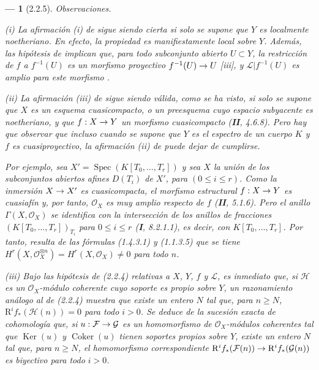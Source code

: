 \documentclass[10pt,oneside,openany]{book}
\theoremstyle{egaenv}\newtheorem*{env}{---}
\theoremstyle{egastatement}
\theoremstyle{egadescription}
\renewcommand{\leq}{\leqslant}
\renewcommand{\geq}{\geqslant}
\renewcommand{\to}{\mathchoice{\longrightarrow}{\rightarrow}{\rightarrow}{\rightarrow}}
\begin{document}
\begin{env}[2.2.5]
\label{III.2.2.5}
\label{III.2.2.5-fr}
\emph{Observaciones.}

(i) La afirmación (i) de  sigue siendo cierta si solo se supone que $Y$ es \emph{localmente noetheriano}.
En efecto, la propiedad es manifiestamente local sobre $Y$.
Además, las hipótesis de  implican que, para todo subconjunto abierto $U\subset Y$, la restricción de $f$ a $f^{-1}(U)$ es un morfismo proyectivo
$f^{-1}(U)\to U$
[iii], y $\mathcal L|f^{-1}(U)$ es amplio para este morfismo .

(ii) La afirmación (iii) de  sigue siendo válida, como se ha visto, si solo se supone que $X$ es un esquema cuasicompacto, o un preesquema cuyo espacio subyacente es noetheriano, y que $f:X\to Y$ un morfismo cuasicompacto (\textbf{II}, 4.6.8). Pero hay que observar que incluso cuando se supone que $Y$ es el \emph{espectro de un cuerpo} $K$ y $f$ es \emph{cuasiproyectivo}, la afirmación (ii) de  puede dejar de cumplirse.

Por ejemplo, sea
$X'=\operatorname{Spec}(K[T_0,\ldots,T_r])$
y sea $X$ la unión de los subconjuntos abiertos afines $D(T_i)$ de $X'$, para $(0\leq i\leq r)$.
Como la inmersión $X\to X'$ es cuasicompacta, el morfismo estructural $f:X\to Y$ es cuasiafín  y, por tanto, $\mathcal O_X$ es muy amplio respecto de $f$ (\textbf{II}, 5.1.6). Pero el anillo
$\Gamma(X,\mathcal O_X)$ se identifica con la intersección de los anillos de
fracciones $(K[T_0,\ldots,T_r])_{T_i}$ para $0\leq i\leq r$
(\textbf{I}, 8.2.1.1), es decir, con $K[T_0,\ldots,T_r]$. Por tanto, resulta
de las fórmulas (1.4.3.1) y (1.1.3.5) que se tiene
$H^r(X,\mathcal O_X^{\otimes n})=H^r(X,\mathcal O_X)\neq0$
para todo $n$.

(iii) Bajo las hipótesis de (2.2.4) relativas a $X$, $Y$, $f$ y $\mathcal L$, es inmediato que, si $\mathcal H$ es un $\mathcal O_X$-módulo coherente cuyo soporte es \emph{propio sobre $Y$}, un razonamiento análogo al de (2.2.4) muestra que existe un entero $N$ tal que, para $n\geq N$,
$\mathrm R^if_*(\mathcal H(n))=0$
para todo $i>0$. Se deduce de la sucesión exacta de cohomología que, si $u:\mathcal F\to\mathcal G$ es un homomorfismo de $\mathcal O_X$-módulos coherentes tal que $\operatorname{Ker}(u)$ y $\operatorname{Coker}(u)$ tienen soportes \emph{propios sobre $Y$}, existe un entero $N$ tal que, para $n\geq N$, el homomorfismo correspondiente
$\mathrm R^if_*(\mathcal F(n))\to\mathrm R^if_*(\mathcal G(n))$
es \emph{biyectivo} para todo $i>0$.
\end{env}
\end{document}
